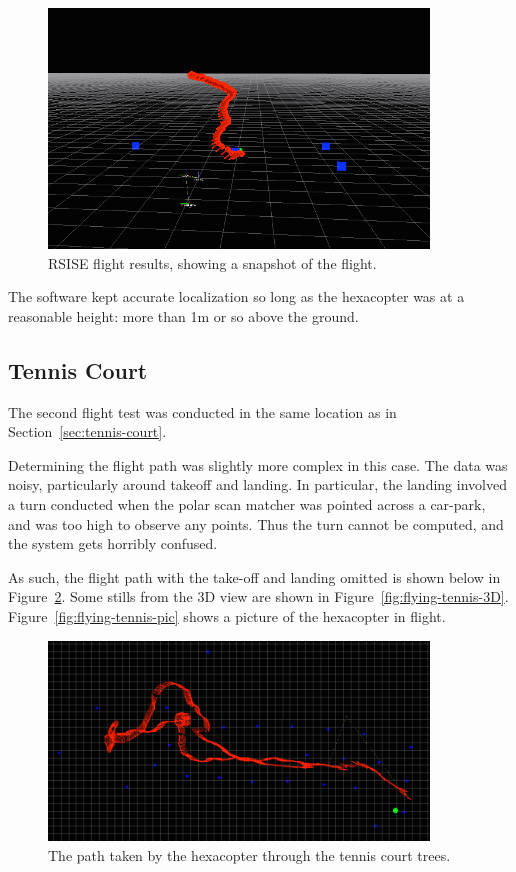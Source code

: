 \documentclass[12pt,oneside,a4paper]{book}
\begin{document}
\begin{figure}
  \centering
  \includegraphics[width=0.9\textwidth]{figs/rsise-flying-results}
  \caption{RSISE flight results, showing a snapshot of the
    flight.}
  \label{fig:rsise-results}
\end{figure}

The software kept accurate localization so long as the hexacopter was
at a reasonable height: more than 1m or so above the ground.

\newpage
\subsection{Tennis Court}
\label{sec:tennis-court-1}

The second flight test was conducted in the same location as in
Section~\ref{sec:tennis-court}. 

Determining the flight path was slightly more complex in this
case. The data was noisy, particularly around takeoff and landing. In
particular, the landing involved a turn conducted when the polar scan
matcher was pointed across a car-park, and was too high to observe any
points. Thus the turn cannot be computed, and the system gets horribly
confused.

As such, the flight path with the take-off and landing omitted is
shown below in Figure~\ref{fig:flying-tennis-path}. Some stills from
the 3D view are shown in
Figure~\ref{fig:flying-tennis-3D}. Figure~\ref{fig:flying-tennis-pic}
shows a picture of the hexacopter in flight.

\begin{figure}[h]
  \centering
  \includegraphics[width=0.9\textwidth]{figs/tennis-flying-results}
  \caption{The path taken by the hexacopter through the tennis court trees.}
  \label{fig:flying-tennis-path}
\end{figure}
\end{document}
